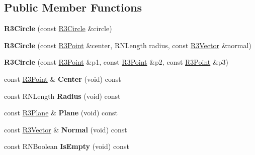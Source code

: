 \subsection*{Public Member Functions}
\begin{DoxyCompactItemize}
\item 
{\bfseries R3\+Circle} (const \hyperlink{class_r3_circle}{R3\+Circle} \&circle)\hypertarget{class_r3_circle_abc03b085f6c58c27c2b879c4618e2524}{}\label{class_r3_circle_abc03b085f6c58c27c2b879c4618e2524}

\item 
{\bfseries R3\+Circle} (const \hyperlink{class_r3_point}{R3\+Point} \&center, R\+N\+Length radius, const \hyperlink{class_r3_vector}{R3\+Vector} \&normal)\hypertarget{class_r3_circle_a3d75cc1a0a47e697c5bcec341425cfd0}{}\label{class_r3_circle_a3d75cc1a0a47e697c5bcec341425cfd0}

\item 
{\bfseries R3\+Circle} (const \hyperlink{class_r3_point}{R3\+Point} \&p1, const \hyperlink{class_r3_point}{R3\+Point} \&p2, const \hyperlink{class_r3_point}{R3\+Point} \&p3)\hypertarget{class_r3_circle_ac23f32d620adfb969598854af21d0462}{}\label{class_r3_circle_ac23f32d620adfb969598854af21d0462}

\item 
const \hyperlink{class_r3_point}{R3\+Point} \& {\bfseries Center} (void) const \hypertarget{class_r3_circle_ab9bb28591f1e04767510a809b25c6a2a}{}\label{class_r3_circle_ab9bb28591f1e04767510a809b25c6a2a}

\item 
const R\+N\+Length {\bfseries Radius} (void) const \hypertarget{class_r3_circle_a237dd84ab801203de2c70d0bf6d493d4}{}\label{class_r3_circle_a237dd84ab801203de2c70d0bf6d493d4}

\item 
const \hyperlink{class_r3_plane}{R3\+Plane} \& {\bfseries Plane} (void) const \hypertarget{class_r3_circle_aa041393e95882f07c9a068bd4cbbfd5d}{}\label{class_r3_circle_aa041393e95882f07c9a068bd4cbbfd5d}

\item 
const \hyperlink{class_r3_vector}{R3\+Vector} \& {\bfseries Normal} (void) const \hypertarget{class_r3_circle_aa8621189894c658b13a8eca22b738b48}{}\label{class_r3_circle_aa8621189894c658b13a8eca22b738b48}

\item 
const R\+N\+Boolean {\bfseries Is\+Empty} (void) const \hypertarget{class_r3_circle_ae7e95e27ae82cc6b6fcf97a078bab288}{}\label{class_r3_circle_ae7e95e27ae82cc6b6fcf97a078bab288}


\end{DoxyCompactItemize}
